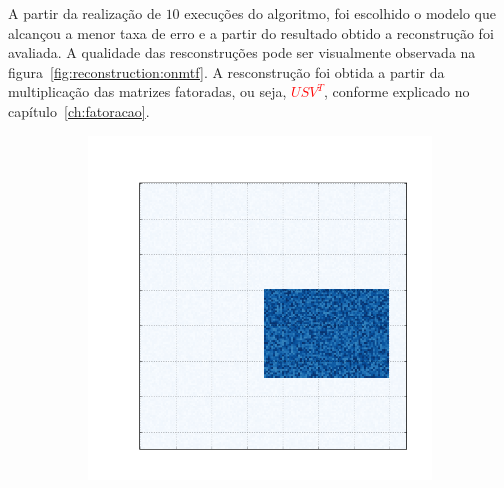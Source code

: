 \documentclass[
    12pt,                %
    oneside,            %
    a4paper,            %
    english,            %
    brazil                %
    ]{abntex2ppgsi}
\begin{document}
A partir da realização de $10$ execuções do algoritmo, foi escolhido o modelo que alcançou a menor taxa de erro e a partir do resultado obtido a reconstrução foi avaliada. A qualidade das resconstruções pode ser visualmente observada na figura~\ref{fig:reconstruction:onmtf}. A resconstrução foi obtida a partir da multiplicação das matrizes fatoradas, ou seja, \textcolor{red}{$USV^T$}, conforme explicado no capítulo~\ref{ch:fatoracao}.    
\begin{figure}[H]
\centering
    \caption{
        As primeiras cinco matrizes são as matrizes originais, as demais são suas respectivas reconstruções, realizadas a partir dos resultados obtidos com o algoritmo \textit{ONMTF}.
    }
    \begin{subfigure}[b]{0.18\textwidth}
        \includegraphics[width=\textwidth]{img/a-bic-structure.png}
    \end{subfigure}
    \begin{subfigure}[b]{0.18\textwidth}

\end{subfigure}
\end{figure}
\end{document}

